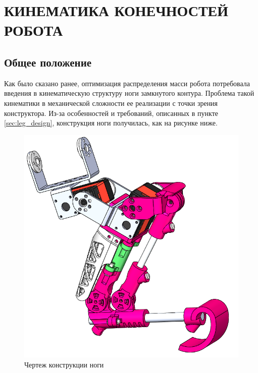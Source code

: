 \chapter{\MakeUppercase{Кинематика конечностей робота}}
\section{Общее положение} \label{sec:kin_general}
Как было сказано ранее, оптимизация распределения масси робота потребовала введения в кинематическую структуру ноги замкнутого контура.
Проблема такой кинематики в механической сложности ее реализации с точки зрения конструктора. Из-за особенностей и требований, описанных в пункте \ref{sec:leg_design}, конструкция ноги получилась, как на рисунке ниже.
\begin{figure}[h]
    \centering
    \includegraphics[scale=0.5]{chapter_kinematics/figure2.png}
    \caption{Чертеж конструкции ноги}
    \label{}
\end{figure}

